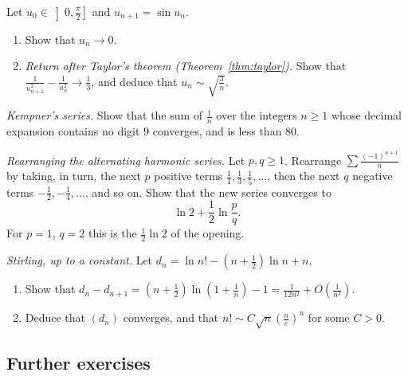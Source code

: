 \begin{exercise}[$\star\star$]\label{ex:sin}
Let $u_0\in\left]0,\frac\pi2\right]$ and $u_{n+1}=\sin u_n$.
\begin{enumerate}[label=(\alph*)]
\item Show that $u_n\to0$.
\item \emph{Return after Taylor's theorem (Theorem~\ref{thm:taylor}).}
Show that $\frac1{u_{n+1}^2}-\frac1{u_n^2}\to\frac13$, and deduce that $u_n\sim\sqrt{\frac3n}$.
\end{enumerate}
\end{exercise}

\begin{exercise}[$\star\star$]\label{ex:kempner}
\emph{Kempner's series.} Show that the sum of $\frac1n$ over the integers $n\ge1$ whose decimal expansion contains no digit $9$ converges, and is less than $80$.
\end{exercise}

\begin{exercise}[$\star\star\star$]\label{ex:rearr}
\emph{Rearranging the alternating harmonic series.} Let $p,q\ge1$. Rearrange $\sum\frac{(-1)^{n+1}}n$ by taking, in turn, the next $p$ positive terms
$\frac11,\frac13,\frac15,\dots$, then the next $q$ negative terms $-\frac12,-\frac14,\dots$, and so on. Show that the new series converges to
\[
\ln2+\frac12\ln\frac pq.
\]
For $p=1$, $q=2$ this is the $\frac12\ln2$ of the opening.
\end{exercise}

\begin{exercise}[$\star\star\star$]\label{ex:stirling}
\emph{Stirling, up to a constant.} Let $d_n=\ln n!-\left(n+\frac12\right)\ln n+n$.
\begin{enumerate}[label=(\alph*)]
\item Show that $d_n-d_{n+1}=\left(n+\frac12\right)\ln\left(1+\frac1n\right)-1=\frac1{12n^2}+O\left(\frac1{n^3}\right)$.
\item Deduce that $(d_n)$ converges, and that $n!\sim C\sqrt n\left(\frac ne\right)^n$ for some $C>0$.
\end{enumerate}
\end{exercise}

\subsection*{Further exercises}

